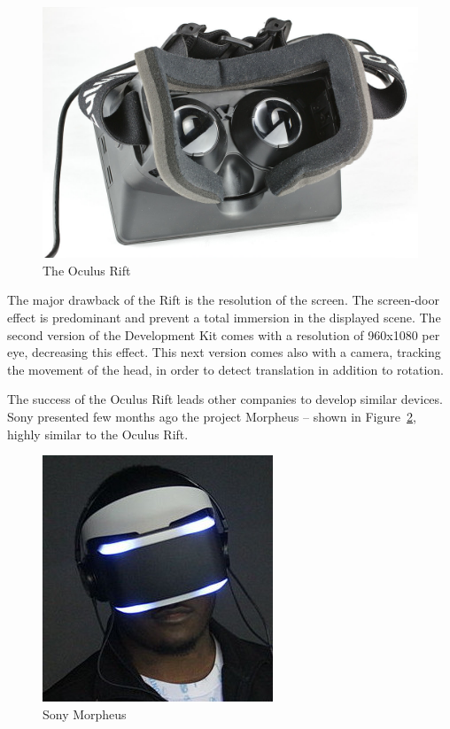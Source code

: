 \documentclass[12pt, twoside]{article}
\begin{document}
\begin{figure}[h]
  \centering
  \includegraphics[scale=0.2]{OculusBack.jpg}
  \caption{\label{fig:oculusback} The Oculus Rift\protect\footnotemark}
\end{figure}

The major drawback of the Rift is the resolution of the screen. The screen-door effect is predominant and prevent a total immersion in the displayed scene. The second version of the Development Kit comes with a resolution of 960x1080 per eye, decreasing this effect. This next version comes also with a camera, tracking the movement of the head, in order to detect translation in addition to rotation.

The success of the Oculus Rift leads other companies to develop similar devices. Sony presented few months ago the project Morpheus \cite{Morpheus} -- shown in Figure~\ref{fig:morpheus}, highly similar to the Oculus Rift.

\begin{figure}[h]
  \centering
  \includegraphics[scale=0.5]{Morpheus.jpg}
  \caption{\label{fig:morpheus} Sony Morpheus\protect\footnotemark}
\end{figure}
\end{document}
